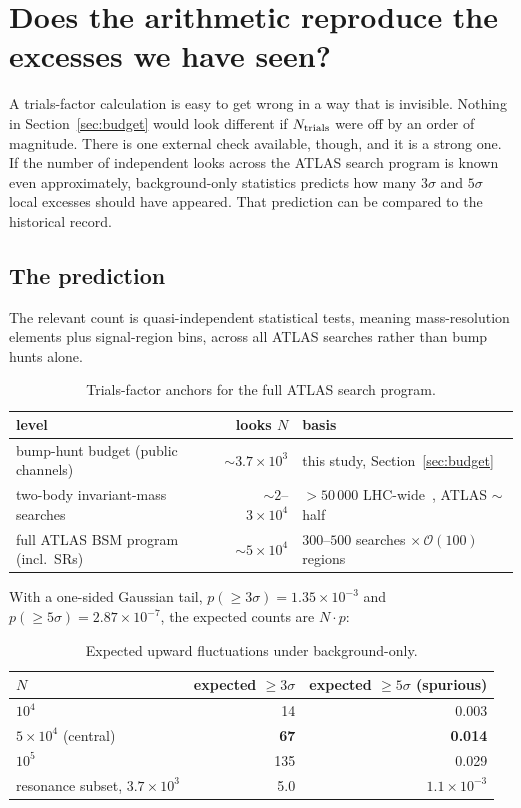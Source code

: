 \section{Does the arithmetic reproduce the excesses we have seen?}
\label{sec:excess}

A trials-factor calculation is easy to get wrong in a way that is invisible. Nothing in
Section~\ref{sec:budget} would look different if $N_{\mathrm{trials}}$ were off by an order of magnitude. There
is one external check available, though, and it is a strong one. If the number of independent
looks across the ATLAS search program is known even approximately, background-only statistics
predicts how many $3\sigma$ and $5\sigma$ local excesses should have appeared. That prediction can
be compared to the historical record.

\subsection{The prediction}

The relevant count is quasi-independent statistical tests, meaning mass-resolution elements plus
signal-region bins, across all ATLAS searches rather than bump hunts alone.

\begin{table}[htbp]
\centering
\small
\caption{Trials-factor anchors for the full ATLAS search program.}
\label{tab:excess_N}
\begin{tabular}{@{}l r >{\raggedright\arraybackslash}p{6.0cm}@{}}
\toprule
level & looks $N$ & basis \\
\midrule
bump-hunt budget (public channels) & $\sim3.7\times10^3$ & this study, Section~\ref{sec:budget} \\
two-body invariant-mass searches & $\sim2$--$3\times10^4$ & $>50\,000$ LHC-wide~\cite{statinterp}, ATLAS $\sim$ half \\
full ATLAS BSM program (incl.\ SRs) & $\sim5\times10^4$ & $300$--$500$ searches $\times\,\mathcal{O}(100)$ regions~\cite{diggingdeeper} \\
\bottomrule
\end{tabular}
\end{table}

With a one-sided Gaussian tail, $p(\ge3\sigma) = 1.35\times10^{-3}$ and $p(\ge5\sigma) =
2.87\times10^{-7}$, the expected counts are $N \cdot p$:

\begin{table}[htbp]
\centering
\caption{Expected upward fluctuations under background-only.}
\label{tab:excess_expected}
\begin{tabular}{lrr}
\toprule
$N$ & expected $\ge3\sigma$ & expected $\ge5\sigma$ (spurious) \\
\midrule
$10^4$ & 14 & 0.003 \\
$5\times10^4$ (central) & \textbf{67} & \textbf{0.014} \\
$10^5$ & 135 & 0.029 \\
resonance subset, $3.7\times10^3$ & 5.0 & $1.1\times10^{-3}$ \\
\bottomrule
\end{tabular}
\end{table}


